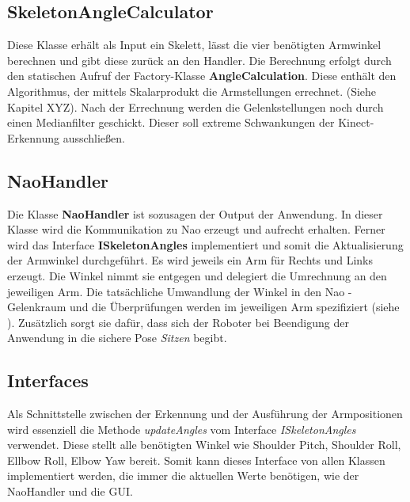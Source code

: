 %
%

\subsection{SkeletonAngleCalculator}
Diese Klasse erhält als Input ein Skelett, lässt die vier benötigten Armwinkel berechnen und gibt diese zurück an den Handler. Die Berechnung erfolgt durch den statischen Aufruf der Factory-Klasse \textbf{AngleCalculation}. Diese enthält den Algorithmus, der mittels Skalarprodukt die Armstellungen errechnet. (Siehe Kapitel XYZ). Nach der Errechnung werden die Gelenkstellungen noch durch einen Medianfilter geschickt. Dieser soll extreme Schwankungen der Kinect-Erkennung ausschließen.

\subsection{NaoHandler}
Die Klasse \textbf{NaoHandler} ist sozusagen der Output der Anwendung. In dieser Klasse wird die Kommunikation zu Nao erzeugt und aufrecht erhalten. Ferner wird das Interface \textbf{ISkeletonAngles} implementiert und somit die Aktualisierung der Armwinkel durchgeführt. Es wird jeweils ein Arm für Rechts und Links erzeugt. Die Winkel nimmt sie entgegen und delegiert die Umrechnung an den jeweiligen Arm. Die tatsächliche Umwandlung der Winkel in den Nao - Gelenkraum und die Überprüfungen werden im jeweiligen Arm spezifiziert (siehe ). Zusätzlich sorgt sie dafür, dass sich der Roboter bei Beendigung der Anwendung in die sichere Pose \textit{Sitzen} begibt.



\subsection{Interfaces}
Als Schnittstelle zwischen der Erkennung und der Ausführung der Armpositionen wird essenziell die Methode \textit{updateAngles} vom Interface \textit{ISkeletonAngles} verwendet. Diese stellt alle benötigten Winkel wie Shoulder Pitch, Shoulder Roll, Ellbow Roll, Elbow Yaw bereit. Somit kann dieses Interface von allen Klassen implementiert werden, die immer die aktuellen Werte benötigen, wie der NaoHandler und die GUI.


